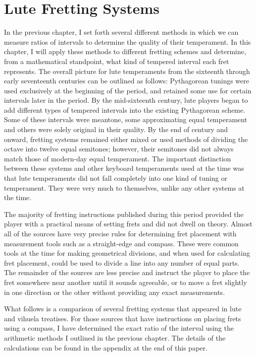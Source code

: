 
\chapter{Lute Fretting Systems}

In the previous chapter, I set forth several different methods in which we can measure
ratios of intervals to determine the quality of their temperament.  In this chapter, I
will apply these methods to different fretting schemes and determine, from a
mathematical standpoint, what kind of tempered interval each fret represents.  The
overall picture for lute temperaments from the sixteenth through early seventeenth
centuries can be outlined as follows: Pythagorean tunings were used exclusively at the
beginning of the period, and retained some use for certain intervals later in the
period. By the mid-sixteenth century, lute players began to add different types of
tempered intervals into the existing Pythagorean scheme.  Some of these intervals were
meantone, some approximating equal temperament and others were solely original in their
quality.  By the end of century and onward, fretting systems remained either mixed or
used methods of dividing the octave into twelve equal semitones; however, their
semitones did not always match those of modern-day equal temperament. The important
distinction between these systems and other keyboard temperaments used at the time was
that lute temperaments did not fall completely into one kind of tuning or temperament.
They were very much to themselves, unlike any other systems at the time.

The majority of fretting instructions published during this period provided the player
with a practical means of setting frets and did not dwell on theory.  Almost all of the
sources have very precise rules for determining fret placement with measurement tools
such as a straight-edge and compass.  These were common tools at the time for making
geometrical divisions, and when used for calculating fret placement, could be used to
divide a line into any number of equal parts.  The remainder of the sources are less
precise and instruct the player to place the fret somewhere near another until it
sounds agreeable, or to move a fret slightly in one direction or the other without
providing any exact measurements.

What follows is a comparison of several fretting systems that appeared in lute and
vihuela treatises. For those sources that have instructions on placing frets using a
compass, I have determined the exact ratio of the interval using the arithmetic methods
I outlined in the previous chapter.  The details of the calculations can be found in
the appendix at the end of this paper.

